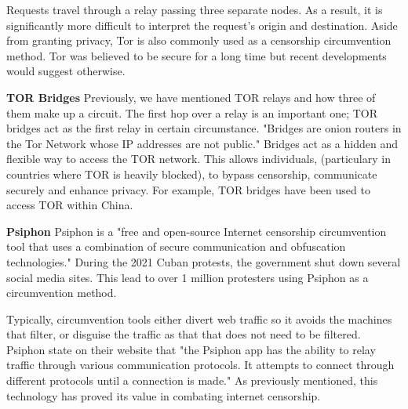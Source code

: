 Requests travel through a relay passing three separate nodes. As a result, it is significantly more difficult to interpret the request’s origin and destination. Aside from granting privacy, Tor is also commonly used as a censorship circumvention method. Tor was believed to be secure for a long time but recent developments would suggest otherwise. \cite{tor_not_secure}

\textbf{TOR Bridges}
Previously, we have mentioned TOR relays and how three of them make up a circuit. The first hop over a relay is an important one; TOR bridges act as the first relay in certain circumstance. "Bridges are onion routers in the Tor Network whose IP addresses are not public." \cite{matic2017dissecting} Bridges act as a hidden and flexible way to access the TOR network. This allows individuals, (particulary in countries where TOR is heavily blocked), to bypass censorship, communicate securely and enhance privacy. For example, TOR bridges have been used to access TOR within China. \cite{dunna2018analyzing} \cite{cyberly_tor_blocked}


\textbf{Psiphon}
Psiphon is a "free and open-source Internet censorship circumvention tool that uses a combination of secure communication and obfuscation technologies." \cite{psiphon_guide} During the 2021 Cuban protests, the government shut down several social media sites. This lead to over 1 million protesters using Psiphon as a circumvention method. \cite{bloomberg_cubans_evade_internet} 

Typically, circumvention tools either divert web traffic so it avoids the machines that filter, or disguise the traffic as that that does not need to be filtered. Psiphon state on their website that "the Psiphon app has the ability to relay traffic through various communication protocols. It attempts to connect through different protocols until a connection is made." \cite{psiphon_guide} As previously mentioned, this technology has proved its value in combating internet censorship. 
